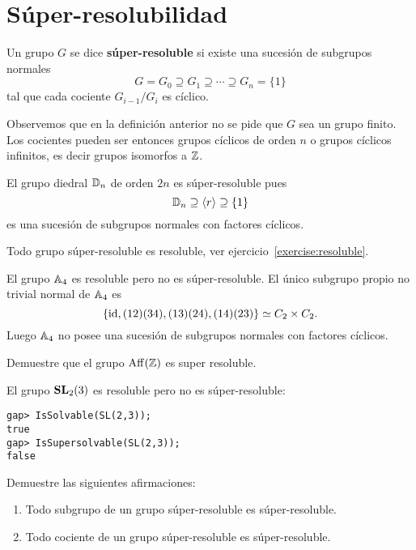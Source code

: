 \chapter{Súper-resolubilidad}

\label{super_resoluble}

\begin{definition}
	Un grupo $G$ se dice \textbf{súper-resoluble} si existe una sucesión de
	subgrupos normales
	\[
		G=G_0\supseteq G_1\supseteq\cdots\supseteq G_n=\{1\}
	\]
	tal que cada cociente $G_{i-1}/G_i$ es cíclico.
\end{definition}

Observemos que en la definición anterior no se pide que $G$ sea un grupo finito. Los cocientes
pueden ser entonces grupos cíclicos de orden $n$ o grupos cíclicos infinitos, es decir grupos 
isomorfos a $\mathbb{Z}$. 

\begin{example}
	El grupo diedral $\mathbb{D}_{n}$ de orden $2n$ es súper-resoluble pues 
    \[	
    \mathbb{D}_{n}\supseteq \langle
	r\rangle\supseteq \{1\}
	\]
	es una sucesión de subgrupos normales con factores
	cíclicos.
\end{example}

Todo grupo súper-resoluble es resoluble, ver ejercicio~\ref{exercise:resoluble}.

\begin{example}
	El grupo $\mathbb{A}_4$ es resoluble pero no es súper-resoluble. El único 
	subgrupo propio no trivial normal de $\mathbb{A}_4$ es
	\[
	\{\operatorname{id},(12)(34),(13)(24),(14)(23)\}\simeq C_2\times C_2.
	\]
	Luego $\mathbb{A}_4$ no posee una sucesión de subgrupos normales con factores
	cíclicos.	
\end{example}

\begin{exercise}
    Demuestre que el grupo $\mathrm{Aff}(\mathbb{Z})$ es super resoluble. 
\end{exercise}

\begin{example}
	El grupo $\mathbf{SL}_2(3)$ es resoluble pero no es súper-resoluble:
\begin{lstlisting}
gap> IsSolvable(SL(2,3));
true
gap> IsSupersolvable(SL(2,3));
false
\end{lstlisting}
\end{example}

\begin{exercise}
	\label{xca:super}
	Demuestre las siguientes afirmaciones:
	\begin{enumerate}
		\item Todo subgrupo de un grupo súper-resoluble es súper-resoluble.
		\item Todo cociente de un grupo súper-resoluble es súper-resoluble.
	\end{enumerate}
\end{exercise}

